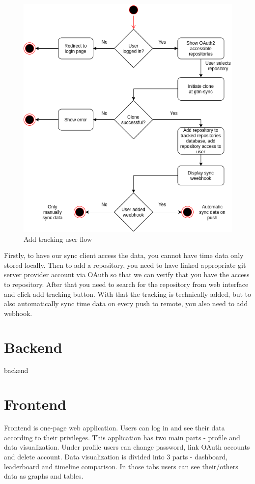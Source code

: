 \begin{figure}[h]
    \includegraphics[width=\textwidth]{figures/add_repo_user_flow}
    \caption{Add tracking user flow}
    \label{fig:add-tracking-user-flow}
\end{figure}

Firstly, to have our sync client access the data, you cannot have time data only stored locally.
Then to add a repository, you need to have linked appropriate git server provider account via OAuth so that we can
verify that you have the access to repository.
After that you need to search for the repository from web interface and click add tracking button.
With that the tracking is technically added, but to also automatically sync time data on every push to remote,
you also need to add webhook.


\section{Backend}\label{sec:backend-content}
backend

\section{Frontend}\label{sec:frontend-content}
Frontend is one-page web application.
Users can log in and see their data according to their privileges.
This application has two main parts - profile and data visualization.
Under profile users can change password, link OAuth accounts and delete account.
Data visualization is divided into 3 parts - dashboard, leaderboard and timeline comparison.
In those tabs users can see their/others data as graphs and tables.

